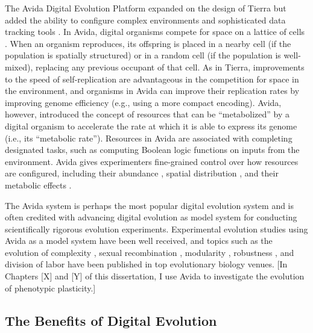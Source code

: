 The Avida Digital Evolution Platform expanded on the design of Tierra but added the ability to configure complex environments and sophisticated data tracking tools  \citep{adami_evolutionary_1994,ofria_avida_2004,ofria_avida:_2009}.
In Avida, digital organisms compete for space on a lattice of cells \citep{ofria_avida:_2009}.
When an organism reproduces, its offspring is placed in a nearby cell (if the population is spatially structured) or in a random cell (if the population is well-mixed), replacing any previous occupant of that cell.
As in Tierra, improvements to the speed of self-replication are advantageous in the competition for space in the environment, and organisms in Avida can improve their replication rates by improving genome efficiency (e.g., using a more compact encoding).
Avida, however, introduced the concept of resources that can be ``metabolized'' by a digital organism to accelerate the rate at which it is able to express its genome (i.e., its ``metabolic rate'').
Resources in Avida are associated with completing designated tasks, such as computing Boolean logic functions on inputs from the environment. %
Avida gives experimenters fine-grained control over how resources are configured, including their abundance \citep{cooper_evolution_2002}, spatial distribution \citep{dolson_spatial_2017}, and their metabolic effects \citep{canino-koning_evolution_2016,canino-koning_fluctuating_2019}.

The Avida system is perhaps the most popular digital evolution system and is often credited with advancing digital evolution as model system for conducting scientifically rigorous evolution experiments.
Experimental evolution studies using Avida as a model system have been well received, and topics such as the evolution of complexity \citep{adami_evolution_2000,lenski_evolutionary_2003}, sexual recombination \citep{misevic_experiments_2010}, modularity \citep{misevic_sexual_2006}, robustness \citep{lenski_genome_1999,elena_effects_2007}, and division of labor \citep{goldsby_task-switching_2012,goldsby_evolutionary_2014} have been published in top evolutionary biology venues.
[In Chapters [X] and [Y] of this dissertation, I use Avida to investigate the evolution of phenotypic plasticity.]

\subsection{The Benefits of Digital Evolution}

